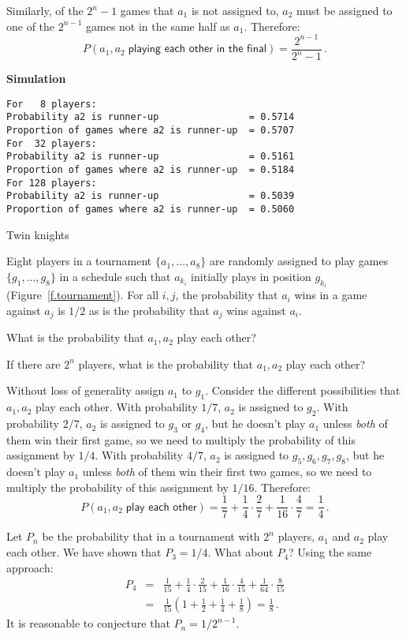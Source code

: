  Similarly, of the $2^n-1$ games that $a_1$ is not assigned to, $a_2$ must be assigned to one of the $2^{n-1}$ games not in the same half as $a_1$. Therefore:
\[
P(a_1,a_2\;\textsf{playing each other in the final})=\frac{2^{n-1}}{2^n-1}\,.
\]

\textbf{Simulation}
\begin{verbatim}
For   8 players:
Probability a2 is runner-up                = 0.5714
Proportion of games where a2 is runner-up  = 0.5707
For  32 players:
Probability a2 is runner-up                = 0.5161
Proportion of games where a2 is runner-up  = 0.5184
For 128 players:
Probability a2 is runner-up                = 0.5039
Proportion of games where a2 is runner-up  = 0.5060
\end{verbatim}


\begin{prob}{Twin knights}

Eight players in a tournament $\{a_1,\ldots,a_8\}$ are randomly assigned to play games $\{g_1,\ldots,g_8\}$ in a schedule such that $a_{k_{i}}$ initially plays in position $g_{k_{i}}$ (Figure~\ref{f.tournament}). For all $i,j$, the probability that $a_i$ wins in a game against $a_j$ is $1/2$ as is the probability that $a_j$ wins against $a_i$.

 What is the probability that $a_1,a_2$ play each other?

 If there are $2^n$ players, what is the probability that $a_1,a_2$ play each other?
\end{prob}

\solution{}

 Without loss of generality assign $a_1$ to $g_1$. Consider the different possibilities that $a_1,a_2$ play each other. With probability $1/7$, $a_2$ is assigned to $g_2$. With probability $2/7$, $a_2$ is assigned to $g_3$ or $g_4$, but he doesn't play $a_1$ unless \emph{both} of them win their first game, so we need to multiply the probability of this assignment by $1/4$. With probability $4/7$, $a_2$ is assigned to $g_5,g_6,g_7,g_8$, but he doesn't play $a_1$ unless \emph{both} of them win their first two  games, so we need to multiply the probability of this assignment by $1/16$. Therefore:
\[
P(a_1, a_2\;\textsf{play each other})=\frac{1}{7} + \frac{1}{4}\cdot \frac{2}{7} + \frac{1}{16}\cdot \frac{4}{7} =\frac{1}{4}\,.
\]

Let $P_n$ be the probability that in a tournament with $2^n$ players, $a_1$ and $a_2$ play each other. We have shown that $P_3=1/4$. What about $P_4$? Using the same approach:
\begin{eqnarray*}
P_4 &=& \frac{1}{15} + \frac{1}{4}\cdot \frac{2}{15}  + \frac{1}{16}\cdot \frac{4}{15}  + \frac{1}{64}\cdot \frac{8}{15} \\
&=&\frac{1}{15}\left(1+\frac{1}{2}+\frac{1}{4}+\frac{1}{8}\right)=\frac{1}{8}\,.
\end{eqnarray*}
It is reasonable to conjecture that $P_n=1/2^{n-1}$.

